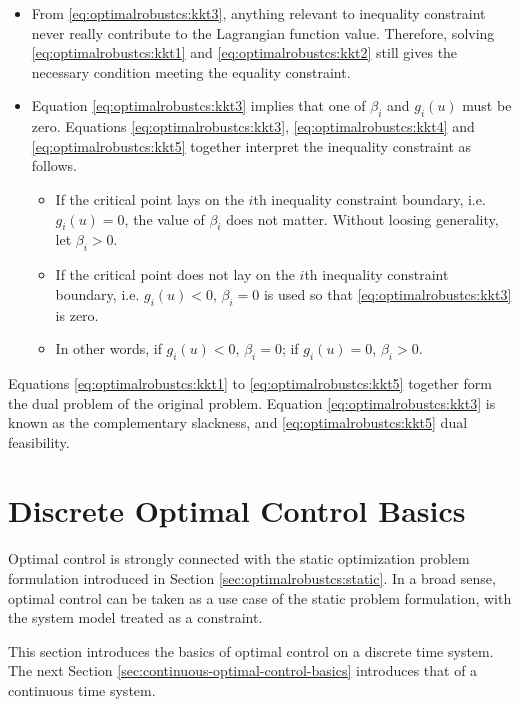 \begin{itemize}
  \item From \eqref{eq:optimalrobustcs:kkt3}, anything relevant to inequality constraint never really contribute to the Lagrangian function value. Therefore, solving \eqref{eq:optimalrobustcs:kkt1} and \eqref{eq:optimalrobustcs:kkt2} still gives the necessary condition meeting the equality constraint.
  \item Equation \eqref{eq:optimalrobustcs:kkt3} implies that one of $\beta_i$ and $g_i(u)$ must be zero. Equations \eqref{eq:optimalrobustcs:kkt3}, \eqref{eq:optimalrobustcs:kkt4} and \eqref{eq:optimalrobustcs:kkt5} together interpret the inequality constraint as follows.
  \begin{itemize}
    \item If the critical point lays on the $i$th inequality constraint boundary, i.e. $g_i(u)=0$, the value of $\beta_i$ does not matter. Without loosing generality, let $\beta_i>0$.
    \item If the critical point does not lay on the $i$th inequality constraint boundary, i.e. $g_i(u)<0$, $\beta_i=0$ is used so that \eqref{eq:optimalrobustcs:kkt3} is zero.
    \item In other words, if $g_i(u)<0$, $\beta_i=0$; if $g_i(u)=0$, $\beta_i>0$.
  \end{itemize}
\end{itemize}

Equations \eqref{eq:optimalrobustcs:kkt1} to \eqref{eq:optimalrobustcs:kkt5} together form the dual problem of the original problem. Equation \eqref{eq:optimalrobustcs:kkt3} is known as the complementary slackness, and \eqref{eq:optimalrobustcs:kkt5} dual feasibility.

\section{Discrete Optimal Control Basics} \label{sec:optimalrobustcs:discrete}

Optimal control is strongly connected with the static optimization problem formulation introduced in Section \ref{sec:optimalrobustcs:static}. In a broad sense, optimal control can be taken as a use case of the static problem formulation, with the system model treated as a constraint.

This section introduces the basics of optimal control on a discrete time system. The next Section \ref{sec:continuous-optimal-control-basics} introduces that of a continuous time system.

